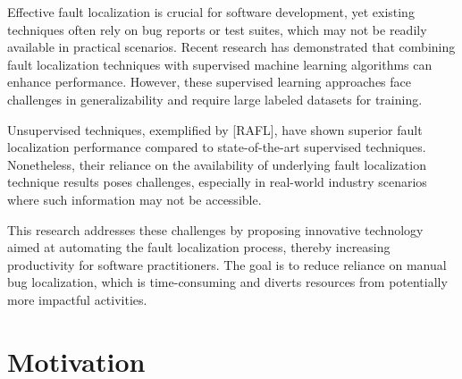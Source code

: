 \documentclass[sigconf]{acmart}
\begin{document}
Effective fault localization is crucial for software development, yet existing techniques often rely on bug reports or test suites, which may not be readily available in practical scenarios. Recent research has demonstrated that combining fault localization techniques with supervised machine learning algorithms can enhance performance. However, these supervised learning approaches face challenges in generalizability and require large labeled datasets for training.

Unsupervised techniques, exemplified by [RAFL], have shown superior fault localization performance compared to state-of-the-art supervised techniques. Nonetheless, their reliance on the availability of underlying fault localization technique results poses challenges, especially in real-world industry scenarios where such information may not be accessible.

This research addresses these challenges by proposing innovative technology aimed at automating the fault localization process, thereby increasing productivity for software practitioners. The goal is to reduce reliance on manual bug localization, which is time-consuming and diverts resources from potentially more impactful activities.


\section{Motivation}
\end{document}
